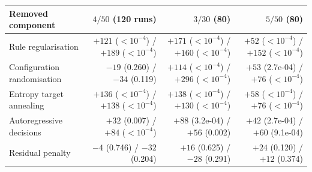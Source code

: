 \begin{tabular}{lrrr}
\toprule
Removed component & $4/50$ (120 runs) & $3/30$ (80) & $5/50$ (80) \\
\midrule
Rule regularisation & $+121$ ($<10^{-4}$) / $+189$ ($<10^{-4}$) & $+171$ ($<10^{-4}$) / $+160$ ($<10^{-4}$) & $+52$ ($<10^{-4}$) / $+152$ ($<10^{-4}$) \\
Configuration randomisation & $-19$ (0.260) / $-34$ (0.119) & $+114$ ($<10^{-4}$) / $+296$ ($<10^{-4}$) & $+53$ (2.7e-04) / $+76$ ($<10^{-4}$) \\
Entropy target annealing & $+136$ ($<10^{-4}$) / $+138$ ($<10^{-4}$) & $+138$ ($<10^{-4}$) / $+130$ ($<10^{-4}$) & $+58$ ($<10^{-4}$) / $+76$ ($<10^{-4}$) \\
Autoregressive decisions & $+32$ (0.007) / $+84$ ($<10^{-4}$) & $+88$ (3.2e-04) / $+56$ (0.002) & $+42$ (2.7e-04) / $+60$ (9.1e-04) \\
Residual penalty & $-4$ (0.746) / $-32$ (0.204) & $+16$ (0.625) / $-28$ (0.291) & $+24$ (0.120) / $+12$ (0.374) \\
\bottomrule
\end{tabular}%
